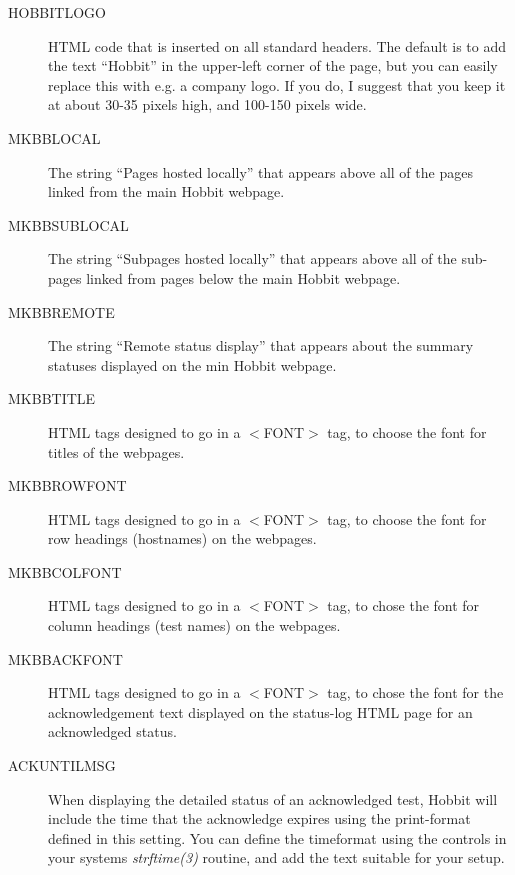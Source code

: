  \begin{description}
\item[HOBBITLOGO] HTML code that is inserted on all standard headers. The default is to add the text ``Hobbit'' in the upper-left corner of the page, but you can easily replace this with e.g. a company logo. If you do, I suggest that you keep it at about 30-35 pixels high, and 100-150 pixels wide. 

 

\item[MKBBLOCAL] The string ``Pages hosted locally'' that appears above all of the pages linked from the main Hobbit webpage. 

 

\item[MKBBSUBLOCAL] The string ``Subpages hosted locally'' that appears above all of the sub-pages linked from pages below the main Hobbit webpage. 

 

\item[MKBBREMOTE] The string ``Remote status display'' that appears about the summary statuses displayed on the min Hobbit webpage. 

 

\item[MKBBTITLE] HTML tags designed to go in a $<$FONT$>$ tag, to choose the font for titles of the webpages. 

 

\item[MKBBROWFONT] HTML tags designed to go in a $<$FONT$>$ tag, to choose the font for row headings (hostnames) on the webpages. 

 

\item[MKBBCOLFONT] HTML tags designed to go in a $<$FONT$>$ tag, to chose the font for column headings (test names) on the webpages. 

 

\item[MKBBACKFONT] HTML tags designed to go in a $<$FONT$>$ tag, to chose the font for the acknowledgement text displayed on the status-log HTML page for an acknowledged status. 

 

\item[ACKUNTILMSG] When displaying the detailed status of an acknowledged test, Hobbit will include the time that the acknowledge expires using the print-format defined in this setting. You can define the timeformat using the controls in your systems \emph{strftime(3)}
 routine, and add the text suitable for your setup. 


\end{description}
